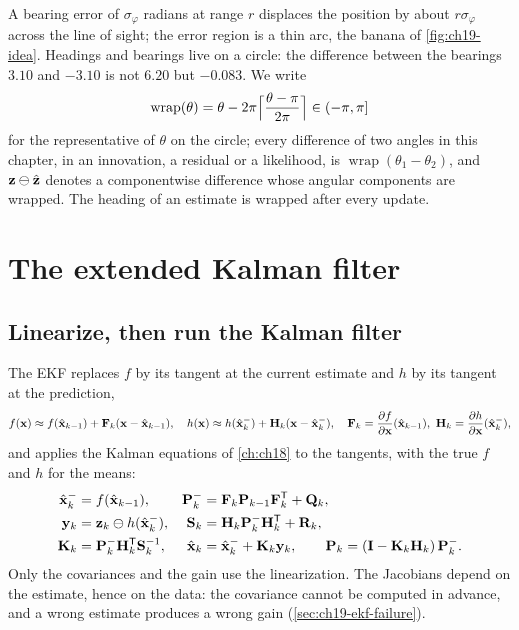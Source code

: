 A bearing error of $\sigma_\varphi$ radians at range $r$ displaces the
position by about $r\sigma_\varphi$ across the line of sight; the error
region is a thin arc, the banana of \cref{fig:ch19-idea}. Headings and
bearings live on a circle: the
difference between the bearings $3.10$ and $-3.10$ is not $6.20$ but
$-0.083$. We write
\begin{equation}
  \operatorname{wrap}(\theta) = \theta - 2\pi\Bigl\lceil \frac{\theta - \pi}{2\pi} \Bigr\rceil
  \in (-\pi, \pi]
  \label{eq:ch19-wrap}
\end{equation}
for the representative of $\theta$ on the circle; every difference of two
angles in this chapter, in an innovation, a residual or a likelihood, is
$\operatorname{wrap}(\theta_1 - \theta_2)$, and $\mathbf{z} \ominus \hat{\mathbf{z}}$
denotes a componentwise difference whose angular components are wrapped.
The heading of an estimate is wrapped after every update.

\section{The extended Kalman filter}
\label{sec:ch19-ekf}

\subsection{Linearize, then run the Kalman filter}

The EKF replaces $f$ by its tangent at the current estimate and $h$ by its
tangent at the prediction,
\begin{equation}
  f(\mathbf{x}) \approx f(\hat{\mathbf{x}}_{k-1}) + \mathbf{F}_k(\mathbf{x} - \hat{\mathbf{x}}_{k-1}),
  \quad
  h(\mathbf{x}) \approx h(\hat{\mathbf{x}}_k^-) + \mathbf{H}_k(\mathbf{x} - \hat{\mathbf{x}}_k^-),
  \quad
  \mathbf{F}_k = \frac{\partial f}{\partial \mathbf{x}}(\hat{\mathbf{x}}_{k-1}),\
  \mathbf{H}_k = \frac{\partial h}{\partial \mathbf{x}}(\hat{\mathbf{x}}_k^-),
  \label{eq:ch19-ekf-linearise}
\end{equation}
and applies the Kalman equations of \cref{ch:ch18} to the tangents, with the
true $f$ and $h$ for the means:
\begin{align}
  \hat{\mathbf{x}}_k^- &= f(\hat{\mathbf{x}}_{k-1}),
  & \mathbf{P}_k^- &= \mathbf{F}_k \mathbf{P}_{k-1} \mathbf{F}_k^{\mathsf{T}} + \mathbf{Q}_k,
  \label{eq:ch19-ekf-predict}\\
  \mathbf{y}_k &= \mathbf{z}_k \ominus h(\hat{\mathbf{x}}_k^-),
  & \mathbf{S}_k &= \mathbf{H}_k \mathbf{P}_k^- \mathbf{H}_k^{\mathsf{T}} + \mathbf{R}_k,
  \label{eq:ch19-ekf-innovation}\\
  \mathbf{K}_k &= \mathbf{P}_k^- \mathbf{H}_k^{\mathsf{T}} \mathbf{S}_k^{-1},
  & \hat{\mathbf{x}}_k &= \hat{\mathbf{x}}_k^- + \mathbf{K}_k \mathbf{y}_k,
  \qquad
  \mathbf{P}_k = (\mathbf{I} - \mathbf{K}_k \mathbf{H}_k)\,\mathbf{P}_k^-.
  \label{eq:ch19-ekf-update}
\end{align}
Only the covariances and the gain use the linearization. The Jacobians
depend on the estimate, hence on the data: the covariance cannot be computed
in advance, and a wrong estimate produces a wrong gain
(\cref{sec:ch19-ekf-failure}).

